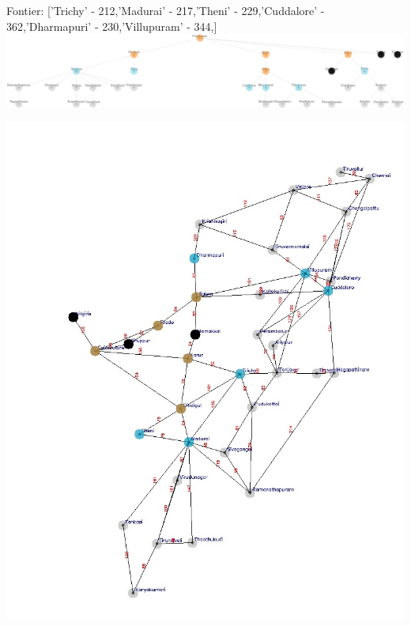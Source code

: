 \documentclass[xcolor=table]{beamer}
\begin{document}
\begin{frame}
  { \tiny Fontier: ['Trichy' - 212,'Madurai' - 217,'Theni' - 229,'Cuddalore' - 362,'Dharmapuri' - 230,'Villupuram' - 344,] }
  \includegraphics[width=1\textwidth]{../UCSNodes/13-1.png}
  \begin{center}
    \includegraphics[height=0.6\textheight]{../UCSoutput/tamilUCS11.jpg}
  \end{center}
\end{frame}
\end{document}
